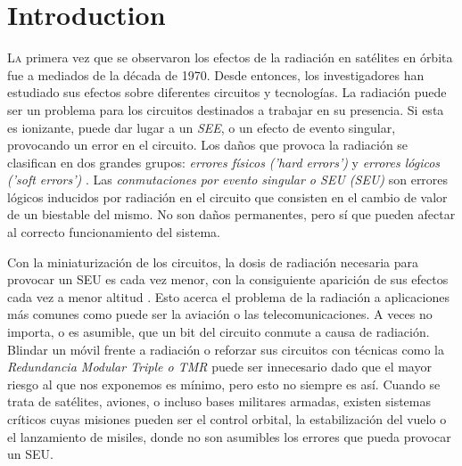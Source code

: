 \chapter{Introduction}
\label{ch:Introduction}

\lettrine[lraise=-0.1, lines=2, loversize=0.2]{L}{a} primera vez que se observaron
los efectos de la radiación en satélites en órbita fue a mediados de la década de
1970. Desde entonces, los investigadores han estudiado sus efectos sobre
diferentes circuitos y tecnologías. La radiación puede ser un problema para los
circuitos destinados a trabajar en su presencia. Si esta es ionizante, puede dar
lugar a un \textit{\gls{SEE}}, o un efecto de evento singular, provocando un error 
en el circuito. Los daños que provoca la radiación se clasifican en dos grandes 
grupos: \textit{errores físicos ('hard errors')} y \textit{errores lógicos ('soft
errors')} \cite{TesisPoli}. Las \textit{conmutaciones por evento singular o 
\acrlong{SEU} (\acrshort{SEU})} son errores lógicos inducidos por radiación en el 
circuito que consisten en el cambio de valor de un biestable del mismo. No son 
daños permanentes, pero sí que pueden afectar al correcto funcionamiento del 
sistema.

Con la miniaturización de los circuitos, la dosis de radiación necesaria para 
provocar un \gls{SEU} es cada vez menor, con la consiguiente aparición de sus 
efectos cada vez a menor altitud \cite{EDN}. Esto acerca el problema de la 
radiación a aplicaciones más comunes como puede ser la aviación o las 
telecomunicaciones. A veces no importa, o es asumible, que un bit del circuito 
conmute a causa de radiación. Blindar un móvil frente a radiación o reforzar sus
circuitos con técnicas como la \textit{Redundancia Modular Triple o \gls{TMR}}
\cite{TMR} puede ser innecesario dado que el mayor riesgo al que nos exponemos es 
mínimo, pero esto no siempre es así. Cuando se trata de satélites, aviones, o 
incluso bases militares armadas, existen sistemas críticos cuyas misiones pueden 
ser el control orbital, la estabilización del vuelo o el lanzamiento de misiles, 
donde no son asumibles los errores que pueda provocar un \gls{SEU}.


